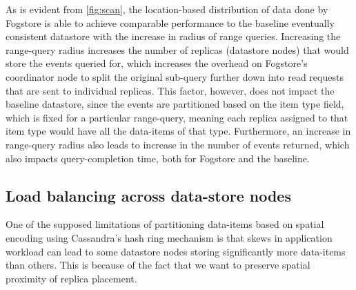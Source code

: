 \par As is evident from \ref{fig:scan}, the location-based distribution of data done by Fogstore is able to achieve comparable performance to the baseline eventually consistent datastore with the increase in radius of range queries. Increasing the range-query radius increases the number of replicas (datastore nodes) that would store the events queried for, which increases the overhead on Fogstore's coordinator node to split the original sub-query further down into read requests that are sent to individual replicas. This factor, however, does not impact the baseline datastore, since the events are partitioned based on the item type field, which is fixed for a particular range-query, meaning each replica assigned to that item type would have all the data-items of that type. Furthermore, an increase in range-query radius also leads to increase in the number of events returned, which also impacts query-completion time, both for Fogstore and the baseline.

\subsection{Load balancing across data-store nodes}
One of the supposed limitations of partitioning data-items based on spatial encoding using Cassandra's hash ring mechanism is that skews in application workload can lead to some datastore nodes storing significantly more data-items than others. This is because of the fact that we want to preserve spatial proximity of replica placement. 

